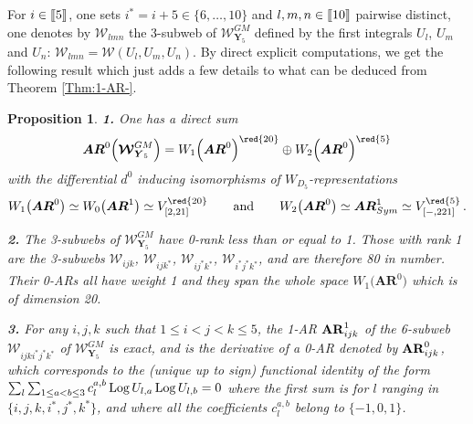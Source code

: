 \documentclass[11pt]{amsart}
\newcommand{\sk}{\smallskip}
\newtheorem{prop}[thm]{Proposition}
\begin{document}
For $i \in [\hspace{-0.05cm}[5]\hspace{-0.05cm}]$, one sets $i^*=i+5\in \{6,\ldots,10\}$ and  $l,m,n\in [\hspace{-0.05cm}[10]\hspace{-0.05cm}] $ pairwise distinct, 
one denotes by $\boldsymbol{\mathcal W}_{lmn}$ the 3-subweb of 
$\boldsymbol{\mathcal W}^{GM}_{ \boldsymbol{Y}_5}$ defined by the first integrals $U_l$, $U_m$ and $U_n$: $\boldsymbol{\mathcal W}_{lmn}=\boldsymbol{\mathcal W}(U_l,U_m,U_n)$. By direct explicit computations, we get the following result which just adds a few details to what can be deduced from 
Theorem \ref{Thm:1-AR-}. 

\begin{prop}
{\bf 1.} One has a  direct sum 
$$
\boldsymbol{AR}^0\Big( 
\boldsymbol{\mathcal W}^{GM}_{ \boldsymbol{Y}_5}
\Big)=W_1\Big(\boldsymbol{AR}^0\Big)^{{\red{20}}}
\oplus 
W_2\Big(\boldsymbol{AR}^0\Big)^{{\red{5}}}
$$ 
with the differential $d^0$ inducing  isomorphisms  of $W_{D_5}$-representations 
$$
W_1\big(\boldsymbol{AR}^0\big)\simeq W_0\big(\boldsymbol{AR}^1\big)\simeq 
V^{{\red{20}}}_{[2,21]}
\qquad \mbox{and} \qquad 
W_2\big(\boldsymbol{AR}^0\big)\simeq \boldsymbol{AR}^1_{Sym}
\simeq 
V^{{\red{5}}}_{[-,221]}\, . 
$$

\noindent 
{\bf 2.} The 3-subwebs of $\boldsymbol{\mathcal W}^{GM}_{ \boldsymbol{Y}_5}
$ have 0-rank less than or equal to 1. Those with rank 1 are the 3-subwebs 
$\boldsymbol{\mathcal W}_{ijk}$, 
$\boldsymbol{\mathcal W}_{ijk^*}$, 
$\boldsymbol{\mathcal W}_{ij^*k^*}$, $\boldsymbol{\mathcal W}_{i^*j^*k^*}$, and are therefore 80 in number. Their 0-ARs all have weight 1 and they span the whole space $W_1\big(\boldsymbol{AR}^0\big)$ which is of dimension 20. 

\noindent 
{\bf 3.} For any $i,j,k$ such that $1\leq i<j<k\leq 5$, the 
1-AR ${\bf AR}^1_{ijk}$ of 
the 6-subweb $\boldsymbol{\mathcal W}_{ijki^*j^*k^*}$ of $\boldsymbol{\mathcal W}_{\boldsymbol{Y}_5}^{GM}$ is exact, and is the derivative of a 0-AR denoted by 
${\bf AR}^0_{ijk}$, which corresponds to  the (unique up to sign) functional identity of the form
$\sum_l \sum_{1\leq a<b\leq 3} c_{l}^{a,b} \,{\rm Log}\,U_{l,a} \, {\rm Log}\,U_{l,b}=0$ where the first sum is for $l$ ranging in $\{i,j,k,i^*,j^*,k^*\}$, and where all the coefficients $c_{l}^{a,b}$ belong to $\{-1,0,1\}$. 


\end{prop}
\end{document}
